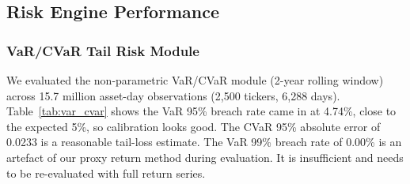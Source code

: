 \documentclass[conference]{IEEEtran}
\begin{document}
\subsection{Risk Engine Performance}
\subsubsection{VaR/CVaR Tail Risk Module}
We evaluated the non-parametric VaR/CVaR module (2-year rolling window) across 15.7 million asset-day observations (2,500 tickers, 6,288 days). Table~\ref{tab:var_cvar} shows the VaR 95\% breach rate came in at 4.74\%, close to the expected 5\%, so calibration looks good. The CVaR 95\% absolute error of 0.0233 is a reasonable tail-loss estimate. The VaR 99\% breach rate of 0.00\% is an artefact of our proxy return method during evaluation. It is insufficient and needs to be re-evaluated with full return series.
\end{document}
